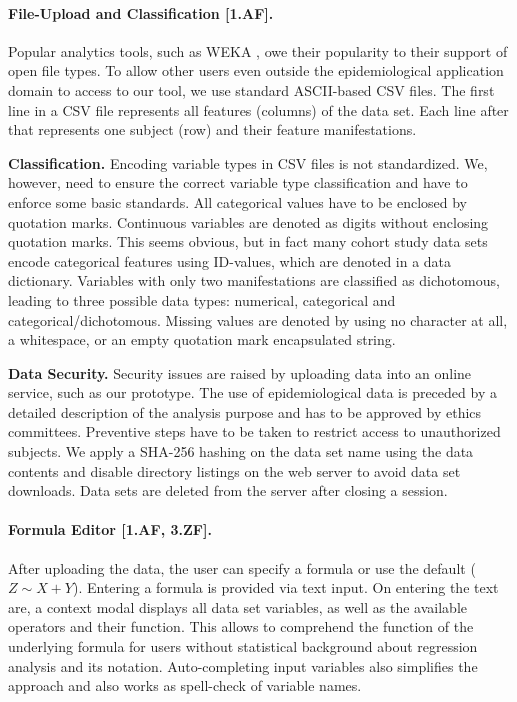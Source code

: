 \documentclass[journal]{style/vgtc} 			          %
\begin{document}
\paragraph{File-Upload and Classification [1.AF].}
Popular analytics tools, such as WEKA \cite{WEKA}, owe their popularity to their support of open file types.
To allow other users even outside the epidemiological application domain to access to our tool, we use standard ASCII-based CSV files.
The first line in a CSV file represents all features (columns) of the data set.
Each line after that represents one subject (row) and their feature manifestations.

\textbf{Classification.}
Encoding variable types in CSV files is not standardized.
We, however, need to ensure the correct variable type classification and have to enforce some basic standards.
All categorical values have to be enclosed by quotation marks.
Continuous variables are denoted as digits without enclosing quotation marks.
This seems obvious, but in fact many cohort study data sets encode categorical features using ID-values, which are denoted in a data dictionary.
Variables with only two manifestations are classified as dichotomous, leading to three possible data types: numerical, categorical and categorical/dichotomous.
Missing values are denoted by using no character at all, a whitespace, or an empty quotation mark encapsulated string.

\textbf{Data Security.}
Security issues are raised by uploading data into an online service, such as our prototype.
The use of epidemiological data is preceded by a detailed description of the analysis purpose and has to be approved by ethics committees.
Preventive steps have to be taken to restrict access to unauthorized subjects.
We apply a SHA-256 hashing on the data set name using the data contents and disable directory listings on the web server to avoid data set downloads.
Data sets are deleted from the server after closing a session.

\paragraph{Formula Editor [1.AF, 3.ZF].}
After uploading the data, the user can specify a formula or use the default ($Z \sim X + Y$).
Entering a formula is provided via text input.
On entering the text are, a context modal displays all data set variables, as well as the available operators and their function.
This allows to comprehend the function of the underlying formula for users without statistical background about regression analysis and its notation.
Auto-completing input variables also simplifies the approach and also works as spell-check of variable names.
\end{document}
